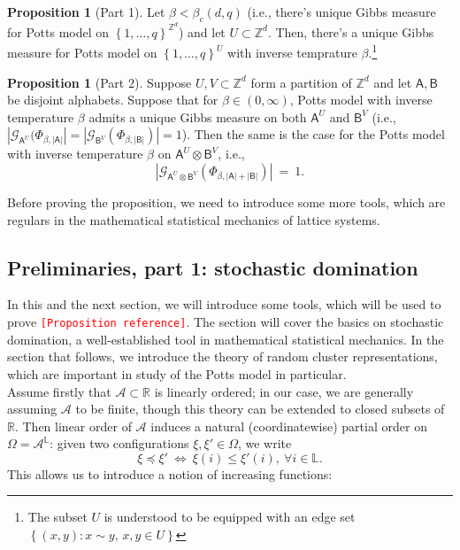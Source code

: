 \documentclass[12pt]{article}
\newcommand{\A}{\mathcal{A}}
\renewcommand{\AA}{\mathsf{A}}
\newcommand{\AB}{\mathsf{B}}
\newcommand{\G}{\mathcal{G}}
\renewcommand{\L}{\mathbb{L}}
\newcommand{\R}{\mathbb{R}}
\newcommand{\Z}{\mathbb{Z}}
\newcommand{\set}[1]{\left\{#1\right\}}
\newcommand{\1}{\mathbbm{1}}
\newcommand{\5}{\vspace{0.5cm}}
\theoremstyle{definition}
\newtheorem{prop}[thm]{Proposition}
\begin{document}
\begin{prop}[Part 1]
Let $\beta<\beta_c(d,q)$ (i.e., there's unique Gibbs measure for Potts model on $\set{1,\ldots,q}^{\Z^d}$) and let $U\subset\Z^d$. Then, there's a unique Gibbs measure for Potts model on $\set{1,\ldots,q}^U$ with inverse temprature $\beta$.\footnote{The subset $U$ is understood to be equipped with an edge set $\set{(x,y):x\sim y,\,x,y\in U}$}
\end{prop}

\begin{prop}[Part 2]
Suppose $U,V\subset\Z^d$ form a partition of $\Z^d$ and let $\AA,\AB$ be disjoint alphabets. Suppose that for $\beta\in(0,\infty)$, Potts model with inverse temperature $\beta$ admits a unique Gibbs measure on both $\AA^U$ and $\AB^V$ (i.e., $|\G_{\AA^U}(\Phi_{\beta,|\AA|}|=|\G_{\AB^V}(\Phi_{\beta,|\AB|})|=1$). Then the same is the case for the Potts model with inverse temperature $\beta$ on $\AA^U\otimes\AB^V$, i.e.,
$$|\G_{\AA^U\otimes\AB^V}(\Phi_{\beta,|\AA|+|\AB|})| ~=~ 1.$$
\end{prop}

Before proving the proposition, we need to introduce some more tools, which are regulars in the mathematical statistical mechanics of lattice systems.


\subsection{Preliminaries, part 1: stochastic domination}

In this and the next section, we will introduce some tools, which will be used to prove \textcolor{red}{\texttt{[Proposition reference]}}. The section will cover the basics on stochastic domination, a well-established tool in mathematical statistical mechanics. In the section that follows, we introduce the theory of random cluster representations, which are important in study of the Potts model in particular. \\

Assume firstly that $\A\subset\R$ is linearly ordered; in our case, we are generally assuming $\A$ to be finite, though this theory can be extended to closed subsets of $\R$. Then linear order of $\A$ induces a natural (coordinatewise) partial order on $\Omega=\A^\L$: given two configurations $\xi,\xi'\in\Omega$, we write
$$\xi\preceq\xi' ~\iff~ \xi(i)\leq\xi'(i),~\forall i\in\L.$$
This allows us to introduce a notion of increasing functions:
\end{document}
